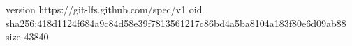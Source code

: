 version https://git-lfs.github.com/spec/v1
oid sha256:418d1124f684a9c84d58e39f7813561217c86bd4a5ba8104a183f80e6d09ab88
size 43840
